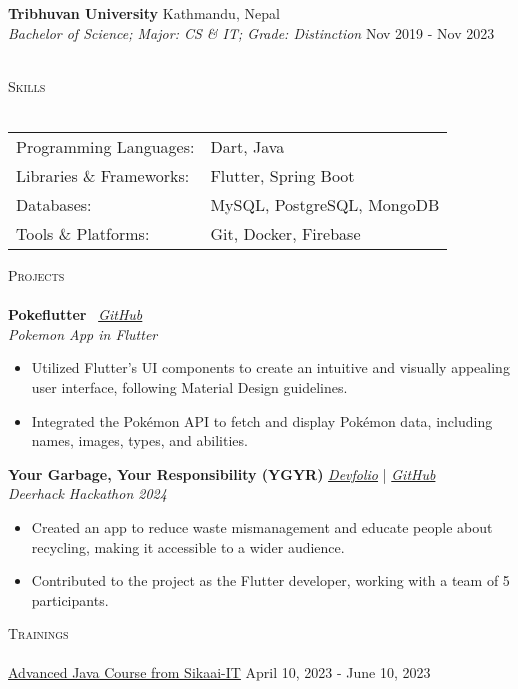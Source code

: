 \documentclass[12pt]{article}
\newcommand{\lineunder} {
    \vspace*{-8pt} \\
    \hspace*{-18pt} \hrulefill \\
}
\newcommand{\header} [1] {   
    {\hspace*{-18pt}\vspace*{6pt} \textsc{#1}}
    \vspace*{-6pt} \lineunder
}
\begin{document}
\textbf{Tribhuvan University} \hfill Kathmandu, Nepal\\
\textit{Bachelor of Science; Major: CS \& IT; Grade: Distinction} \hfill Nov 2019 - Nov 2023\\
\vspace{-1mm}
\

\header{\large{Skills}}
\begin{tabularx}{\textwidth}{ l X } 
	Programming Languages: & Dart, Java \\
	Libraries \& Frameworks:  & Flutter, Spring Boot \\
    Databases:  & MySQL, PostgreSQL, MongoDB \\
    Tools \& Platforms:  & Git, Docker, Firebase \\
\end{tabularx}
\vspace{2mm}


\header{\large{Projects}}

{\textbf{Pokeflutter}} \
\hfill \href{https://github.com/sabinmhx/pokeflutter} {\textit{GitHub}}\\
\textit{Pokemon App in Flutter}
\begin{itemize} \itemsep 1pt
	\item Utilized Flutter's UI components to create an intuitive and visually appealing user interface, following Material Design guidelines.  
	\item Integrated the Pokémon API to fetch and display Pokémon data, including names, images, types, and abilities.
\end{itemize}
\vspace*{2mm}

{\textbf{Your Garbage, Your Responsibility (YGYR)}}
\hfill \href{https://devfolio.co/projects/your-garbage-your-responsibility-ygyr-c77e}{\textit{Devfolio}} | \href{https://github.com/xentixar/ygyr}{\textit{GitHub}}\\ \textit{Deerhack Hackathon 2024}
\begin{itemize} \itemsep 1pt
	\item Created an app to reduce waste mismanagement and educate people about recycling, making it accessible to a wider audience.
	\item Contributed to the project as the Flutter developer, working with a team of 5 participants.
\end{itemize}
\vspace*{2mm}


\header{\large{Trainings}}
\href{https://www.sabin-maharjan.com.np/assets/Advanced-Java-Course-Sikaai-IT.pdf}{Advanced Java Course from Sikaai-IT} \hfill April 10, 2023 - June 10, 2023\\
\vspace*{2mm}
\end{document}
